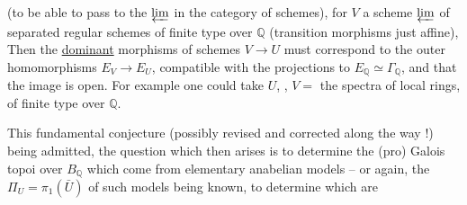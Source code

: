 (to be able to pass to the $\varprojlim$ in the category of schemes), for $V$ a scheme $\varprojlim$ of separated regular schemes of finite type over $\mathbb{Q}$ (transition morphisms  just affine), Then the \uline{dominant} morphisms of schemes $V\longrightarrow U$ must correspond to the outer homomorphisms $E_V\longrightarrow E_U$, compatible with the projections to $E_{\mathbb{Q}}\simeq\Gamma_{\mathbb{Q}}$, and  that the image is open. For example one could take  $U$, , $V=$ the spectra of local rings,  of finite type over $\mathbb{Q}$.


This fundamental conjecture (possibly revised and corrected along the way !) being admitted, the question which then arises is to determine the (pro) Galois topoi over $B_{\mathbb{Q}}$ which come from elementary anabelian models -- or again, the $\Pi_U=\pi_1(\bar U)$ of such models being known, to determine which are
